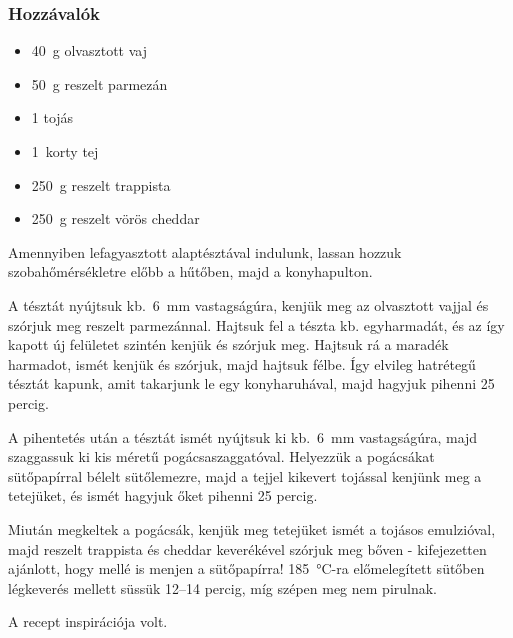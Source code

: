 \subsubsection*{Hozzávalók}
\begin{itemize}
    \item \qty{40}{\g} olvasztott vaj
    \item \qty{50}{\g} reszelt parmezán
    \item \num{1} tojás
    \item \qty{1}{korty} tej
    \item \qty{250}{\g} reszelt trappista
    \item \qty{250}{\g} reszelt vörös cheddar
\end{itemize}

Amennyiben lefagyasztott alaptésztával indulunk, lassan hozzuk szobahőmérsékletre előbb a hűtőben, majd a konyhapulton.

A tésztát nyújtsuk kb.~\qty{6}{\mm} vastagságúra, kenjük meg az olvasztott vajjal és szórjuk meg reszelt parmezánnal. Hajtsuk fel a tészta kb. egyharmadát, és az így kapott új felületet szintén kenjük és szórjuk meg. Hajtsuk rá a maradék harmadot, ismét kenjük és szórjuk, majd hajtsuk félbe. Így elvileg hatrétegű tésztát kapunk, amit takarjunk le egy konyharuhával, majd hagyjuk pihenni \num{25} percig.

A pihentetés után a tésztát ismét nyújtsuk ki kb.~\qty{6}{\mm} vastagságúra, majd szaggassuk ki kis méretű pogácsaszaggatóval. Helyezzük a pogácsákat sütőpapírral bélelt sütőlemezre, majd a tejjel kikevert tojással kenjünk meg a tetejüket, és ismét hagyjuk őket pihenni \num{25} percig.

Miután megkeltek a pogácsák, kenjük meg tetejüket ismét a tojásos emulzióval, majd reszelt trappista és cheddar keverékével szórjuk meg bőven - kifejezetten ajánlott, hogy mellé is menjen a sütőpapírra! \qty{185}{\celsius}-ra előmelegített sütőben légkeverés mellett süssük \numrange{12}{14} percig, míg szépen meg nem pirulnak.

A recept inspirációja \cite{szabi_pogi} volt.
 